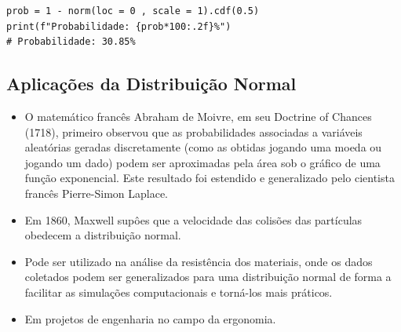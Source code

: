 \begin{verbatim}
prob = 1 - norm(loc = 0 , scale = 1).cdf(0.5)
print(f"Probabilidade: {prob*100:.2f}%")
# Probabilidade: 30.85%
\end{verbatim}

\subsection{Aplicações da Distribuição Normal}
\begin{itemize}
\item O matemático francês Abraham de Moivre, em seu Doctrine of Chances (1718), primeiro observou que as probabilidades associadas a variáveis aleatórias geradas discretamente (como as obtidas jogando uma moeda ou jogando um dado) podem ser aproximadas pela área sob o gráfico de uma função exponencial. Este resultado foi estendido e generalizado pelo cientista francês Pierre-Simon Laplace.
\item Em 1860, Maxwell supôes que a velocidade das colisões das partículas obedecem a distribuição normal.
\item Pode ser utilizado na análise da resistência dos materiais, onde os dados coletados podem ser generalizados para uma distribuição normal de forma a facilitar as simulações computacionais e torná-los mais práticos. 
\item Em projetos de engenharia no campo da ergonomia.
\end{itemize}